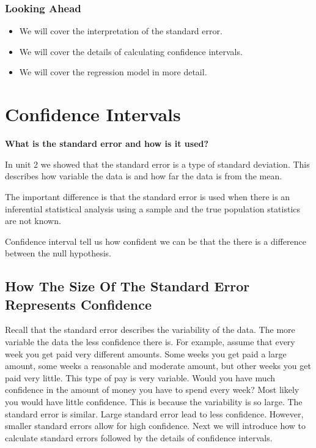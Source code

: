 \documentclass[]{book}
\theoremstyle{definition}
\theoremstyle{definition}
\theoremstyle{definition}
\theoremstyle{remark}
\begin{document}
\hypertarget{looking-ahead}{%
\subsection{Looking Ahead}\label{looking-ahead}}

\begin{itemize}
\item
  We will cover the interpretation of the standard error.
\item
  We will cover the details of calculating confidence intervals.
\item
  We will cover the regression model in more detail.
\end{itemize}

\hypertarget{confidence-intervals-1}{%
\chapter{Confidence Intervals}\label{confidence-intervals-1}}

\textbf{What is the standard error and how is it used?}

In unit 2 we showed that the standard error is a type of standard
deviation. This describes how variable the data is and how far the data
is from the mean.

The important difference is that the standard error is used when there
is an inferential statistical analysis using a sample and the true
population statistics are not known.

Confidence interval tell us how confident we can be that the there is a
difference between the null hypothesis.

\hypertarget{how-the-size-of-the-standard-error-represents-confidence}{%
\section{How The Size Of The Standard Error Represents
Confidence}\label{how-the-size-of-the-standard-error-represents-confidence}}

Recall that the standard error describes the variability of the data.
The more variable the data the less confidence there is. For example,
assume that every week you get paid very different amounts. Some weeks
you get paid a large amount, some weeks a reasonable and moderate
amount, but other weeks you get paid very little. This type of pay is
very variable. Would you have much confidence in the amount of money you
have to spend every week? Most likely you would have little confidence.
This is because the variability is so large. The standard error is
similar. Large standard error lead to less confidence. However, smaller
standard errors allow for high confidence. Next we will introduce how to
calculate standard errors followed by the details of confidence
intervals.
\end{document}
